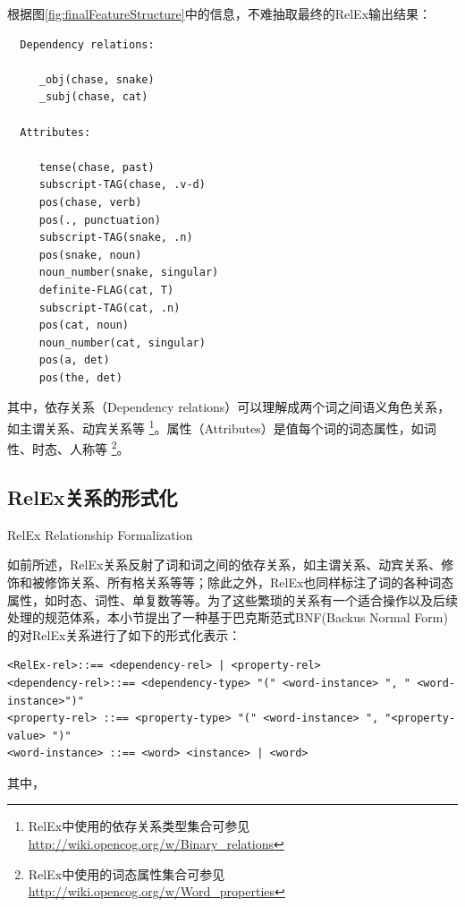 根据图\ref{fig:finalFeatureStructure}中的信息，不难抽取最终的RelEx输出结果：

 \begin{verbatim}
  Dependency relations:

     _obj(chase, snake)
     _subj(chase, cat)

  Attributes:

     tense(chase, past)
     subscript-TAG(chase, .v-d)
     pos(chase, verb)
     pos(., punctuation)
     subscript-TAG(snake, .n)
     pos(snake, noun)
     noun_number(snake, singular)
     definite-FLAG(cat, T)
     subscript-TAG(cat, .n)
     pos(cat, noun)
     noun_number(cat, singular)
     pos(a, det)
     pos(the, det)
\end{verbatim}

其中，依存关系（Dependency relations）可以理解成两个词之间语义角色关系，如主谓关系、动宾关系等 \footnote{RelEx中使用的依存关系类型集合可参见 \url{http://wiki.opencog.org/w/Binary_relations}}。属性（Attributes）是值每个词的词态属性，如词性、时态、人称等 \footnote{RelEx中使用的词态属性集合可参见 \url{http://wiki.opencog.org/w/Word_properties}}。


\subsection{RelEx关系的形式化}{RelEx Relationship Formalization}


如前所述，RelEx关系反射了词和词之间的依存关系，如主谓关系、动宾关系、修饰和被修饰关系、所有格关系等等；除此之外，RelEx也同样标注了词的各种词态属性，如时态、词性、单复数等等。为了这些繁琐的关系有一个适合操作以及后续处理的规范体系，本小节提出了一种基于巴克斯范式BNF(Backus Normal Form)的对RelEx关系进行了如下的形式化表示：

 {\tt\begin{scriptsize}\begin{lstlisting}
<RelEx-rel>::== <dependency-rel> | <property-rel>
<dependency-rel>::== <dependency-type> "(" <word-instance> ", " <word-instance>")"
<property-rel> ::== <property-type> "(" <word-instance> ", "<property-value> ")"
<word-instance> ::== <word> <instance> | <word>
  \end{lstlisting}\end{scriptsize}}

其中，

